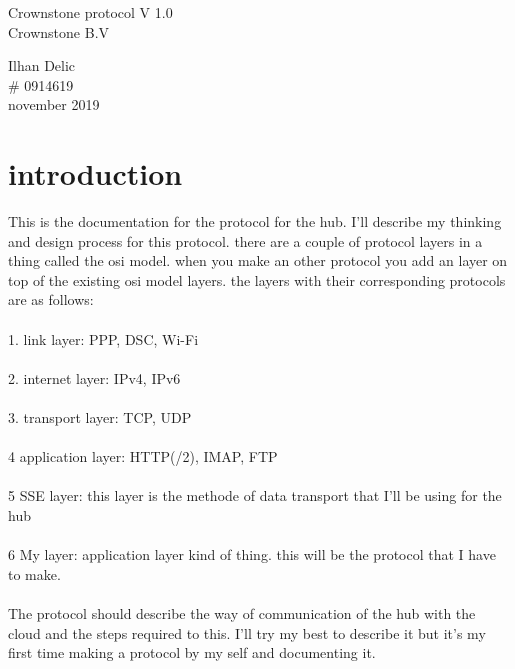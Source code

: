 \documentclass{article}
\begin{document}
\begin{titlepage}
		\begin{center}%
		{\huge{Crownstone protocol V 1.0}}\\ %
		[2cm]
		{\large Crownstone B.V }\\
		[15cm]
		\end{center} 
		\begin{flushright}
		{\large Ilhan Delic \\}
		\# 0914619 \\
		november 2019 \\
		\end{flushright}	
\end{titlepage}
\tableofcontents
\thispagestyle{empty}
\cleardoublepage %
\section{introduction}\label{sec:intro}%
This is the documentation for the protocol for the hub. I'll describe my thinking and design process for this protocol. there are a couple of protocol layers in a thing called the osi model. when you make an other protocol you add an layer on top of the existing osi model layers. the layers with their corresponding protocols are as follows:\\
\\
1. link layer:  PPP, DSC, Wi-Fi\\
\\
2. internet layer: IPv4, IPv6\\
\\
3. transport layer: TCP, UDP\\
\\
4 application layer: HTTP(/2), IMAP, FTP\\
\\
5 SSE layer: this layer is the methode of data transport that I'll be using for the hub\\
\\
6  My layer: application layer kind of thing. this will be the protocol that I have to make.\\
\\
The protocol should describe the way of communication of the hub with the  cloud and the steps required to this. I'll try my best to describe it but it's my first time making a protocol by my self and documenting it. 
\cleardoublepage
\end{document}
